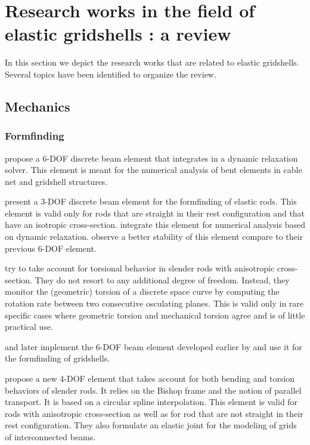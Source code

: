 \clearpage
\section{Research works in the field of elastic gridshells : a review}
In this section we depict the research works that are related to elastic gridshells. Several topics have been identified to organize the review.


\subsection{Mechanics}

\subsubsection{Formfinding}

 propose a 6-DOF discrete beam element that integrates in a dynamic relaxation solver. This element is meant for the numerical analysis of bent elements in cable net and gridshell structures.

 present a 3-DOF discrete beam element for the formfinding of elastic rods. This element is valid only for rods that are straight in their rest configuration and that have an isotropic cross-section.  integrate this element for numerical analysis based on dynamic relaxation.  observe a better stability of this element compare to their previous 6-DOF element.

 try to take account for torsional behavior in slender rods with anisotropic cross-section. They do not resort to any additional degree of freedom. Instead, they monitor the (geometric) torsion of a discrete space curve by computing the rotation rate between two consecutive osculating planes. This is valid only in rare specific cases where geometric torsion and mechanical torsion agree and is of little practical use.

 and later  implement the 6-DOF beam element developed earlier by  and use it for the formfinding of gridshells.

 propose a new 4-DOF element that takes account for both bending and torsion behaviors of slender rods. It relies on the Bishop frame and the notion of parallel transport. It is based on a circular spline interpolation. This element is valid for rods with anisotropic cross-section as well as for rod that are not straight in their rest configuration. They also formulate an elastic joint for the modeling of grids of interconnected beams.

